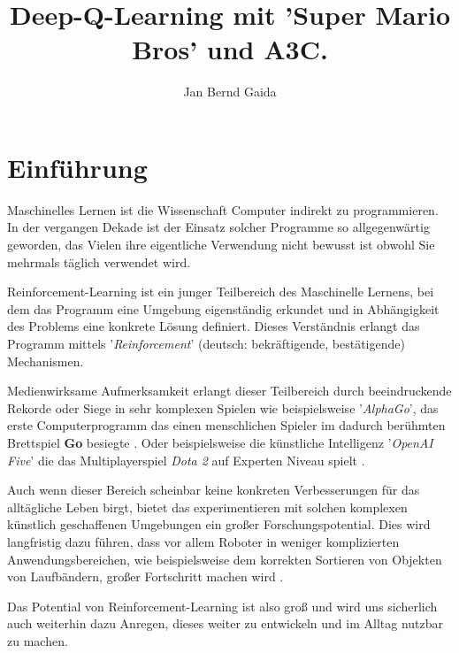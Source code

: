 \documentclass[sigconf,nonacm]{acmart}
\begin{document}
\title{Deep-Q-Learning mit 'Super Mario Bros' und A3C.}

\author{Jan Bernd Gaida}

\maketitle

\section{Einführung}
Maschinelles Lernen ist die Wissenschaft Computer indirekt zu programmieren. In der vergangen Dekade ist der Einsatz solcher Programme so allgegenwärtig geworden, das Vielen ihre eigentliche Verwendung nicht bewusst ist obwohl Sie mehrmals täglich verwendet wird. \cite{andrewWhatIs}

Reinforcement-Learning ist ein junger Teilbereich des Maschinelle Lernens, bei dem das Programm eine Umgebung eigenständig erkundet und in Abhängigkeit des Problems eine konkrete Lösung definiert. Dieses Verständnis erlangt das Programm mittels '\textit{Reinforcement}' (deutsch: bekräftigende, bestätigende) Mechanismen.

Medienwirksame Aufmerksamkeit erlangt dieser Teilbereich durch beeindruckende Rekorde oder Siege in sehr komplexen Spielen wie beispielsweise '\textit{AlphaGo}', das erste Computerprogramm das einen menschlichen Spieler im dadurch berühmten Brettspiel \textbf{Go} besiegte \cite{alphago}. Oder beispielsweise die künstliche Intelligenz '\textit{OpenAI Five}' die das Multiplayerspiel \textit{Dota 2} auf Experten Niveau spielt \cite{openaifive}.

Auch wenn dieser Bereich scheinbar keine konkreten Verbesserungen für das alltägliche Leben birgt, bietet das experimentieren mit solchen komplexen künstlich geschaffenen Umgebungen ein großer Forschungspotential. Dies wird langfristig dazu führen, dass vor allem Roboter in weniger komplizierten Anwendungsbereichen, wie beispielsweise dem korrekten Sortieren von Objekten von Laufbändern, großer Fortschritt machen wird \cite{awbrl}.

Das Potential von Reinforcement-Learning ist also groß und wird uns sicherlich auch weiterhin dazu Anregen, dieses weiter zu entwickeln und im Alltag nutzbar zu machen.
\end{document}
